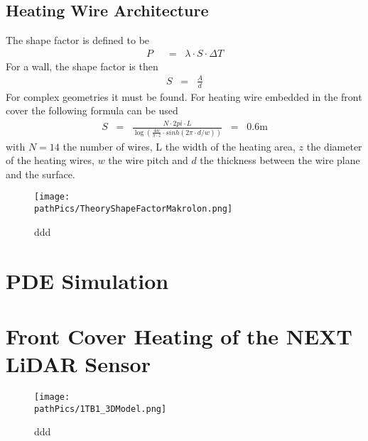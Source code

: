 %

\subsection{Heating Wire Architecture}
The shape factor is defined to be \cite{1975EHahne_UG}
\begin{align}
P \;\; &= \;\; \lambda \cdot S \cdot \Delta T
\end{align}
For a wall, the shape factor is then
\begin{align}
S \;\; = \;\; \frac{A}{d}
\end{align}
For complex geometries it must be found. For heating wire embedded in the front cover the following formula can be used
\begin{align}
S \;\; = \;\; \frac{N\cdot 2pi\cdot L}{\log\left(\frac{4w}{\pi\cdot z}\cdot sinh(2\pi \cdot d/w)\right)} \;\; = \;\; 0.6 \mathrm{m}
\end{align}
with \(N = 14\) the number of wires, L the width of the heating area, \(z\) the diameter of the heating wires, \(w\) the wire pitch and \(d\) the thickness between the wire plane and the surface.
\begin{figure} [H]
	\centering
	\texttt{[image: \\pathPics/TheoryShapeFactorMakrolon.png]}
	\caption[NEXT LiDAR Sensor Model]{ddd}
	\label{fig:ShapeFactorMakrolon}
\end{figure}
\section{PDE Simulation}
\section{Front Cover Heating of the NEXT LiDAR Sensor}

\begin{figure} [H]
	\centering
	\texttt{[image: \\pathPics/1TB1\_3DModel.png]}
	\caption[NEXT LiDAR Sensor Model]{ddd}
	\label{fig:1TB1Model}
\end{figure}


